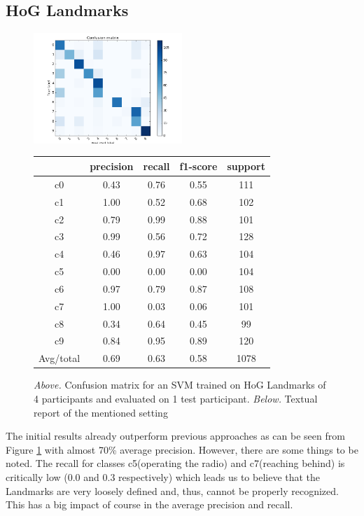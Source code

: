 \documentclass[10pt,twocolumn,letterpaper]{article}
\begin{document}
\subsection{HoG Landmarks}
\begin{figure}[h]
	\centering
	\includegraphics[width=0.5\textwidth]{mult_HOG/4c0123456789matComparable}
	\begin{tabular}{c||c|c|c|c}
		& precision&recall&f1-score&support\\	\hline
		c0&0.43&0.76&0.55&111\\
		c1&1.00&0.52&0.68&102\\
		c2&0.79&0.99&0.88&101\\
		c3&0.99&0.56&0.72&128\\
		c4&0.46&0.97&0.63&104\\
		c5&0.00&0.00&0.00&104\\
		c6&0.97&0.79&0.87&108\\
		c7&1.00&0.03&0.06&101\\
		c8&0.34&0.64&0.45&99\\
		c9&0.84&0.95&0.89&120\\ \hline
		Avg/total &0.69&0.63& 0.58 &1078
	\end{tabular}
	\caption{\textit{Above.} Confusion matrix for an SVM trained on HoG Landmarks of 4 participants and evaluated on 1 test participant. \textit{Below.} Textual report of the mentioned setting}
	\label{Landmarks_4all}
\end{figure}

The initial results already outperform previous approaches as can be seen from Figure \ref{Landmarks_4all}  with almost 70\% average precision. However, there are some things to be noted. The recall for classes c5(operating the radio) and c7(reaching behind) is critically low (0.0 and 0.3 respectively) which leads us to believe that the Landmarks are very loosely defined and, thus, cannot be properly recognized. This has a big impact of course in the average precision and recall. 
\end{document}
